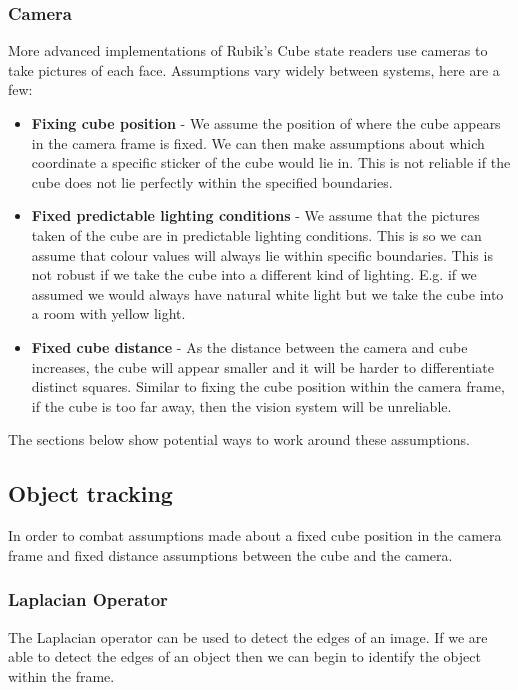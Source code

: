 \documentclass[titlepage]{report}[12pt]
\begin{document}
\subsubsection{Camera}
More advanced implementations of Rubik's Cube state readers use cameras to take pictures of each face. Assumptions vary widely between systems, here are a few:
\begin{itemize}
\item \textbf{Fixing cube position} - We assume the position of where the cube appears in the camera frame is fixed. We can then make assumptions about which coordinate a specific sticker of the cube would lie in. This is not reliable if the cube does not lie perfectly within the specified boundaries.
\item \textbf{Fixed predictable lighting conditions} -  We assume that the pictures taken of the cube are in predictable lighting conditions. This is so we can assume that colour values will always lie within specific boundaries. This is not robust if we take the cube into a different kind of lighting. E.g. if we assumed we would always have natural white light but we take the cube into a room with yellow light. 
\item \textbf{Fixed cube distance} - As the distance between the camera and cube increases, the cube will appear smaller and it will be harder to differentiate distinct squares. Similar to fixing the cube position within the camera frame, if the cube is too far away, then the vision system will be unreliable.
\end{itemize}
The sections below show potential ways to work around these assumptions.

\subsection{Object tracking}
In order to combat assumptions made about a fixed cube position in the camera frame and fixed distance assumptions between the cube and the camera. 

\subsubsection{Laplacian Operator}
The Laplacian operator can be used to detect the edges of an image. If we are able to detect the edges of an object then we can begin to identify the object within the frame. 
\end{document}
